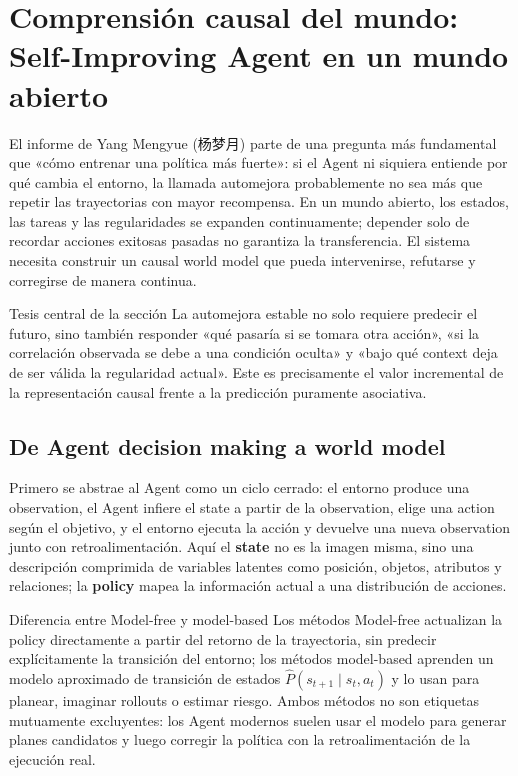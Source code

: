 \section{Comprensión causal del mundo: Self-Improving Agent en un mundo abierto}

El informe de Yang Mengyue (杨梦月) parte de una pregunta más fundamental que «cómo entrenar una política más fuerte»: si el Agent ni siquiera entiende por qué cambia el entorno, la llamada automejora probablemente no sea más que repetir las trayectorias con mayor recompensa. En un mundo abierto, los estados, las tareas y las regularidades se expanden continuamente; depender solo de recordar acciones exitosas pasadas no garantiza la transferencia. El sistema necesita construir un causal world model que pueda intervenirse, refutarse y corregirse de manera continua.

\begin{importantbox}{Tesis central de la sección}
La automejora estable no solo requiere predecir el futuro, sino también responder «qué pasaría si se tomara otra acción», «si la correlación observada se debe a una condición oculta» y «bajo qué context deja de ser válida la regularidad actual». Este es precisamente el valor incremental de la representación causal frente a la predicción puramente asociativa.
\end{importantbox}

\subsection{De Agent decision making a world model}

Primero se abstrae al Agent como un ciclo cerrado: el entorno produce una observation, el Agent infiere el state a partir de la observation, elige una action según el objetivo, y el entorno ejecuta la acción y devuelve una nueva observation junto con retroalimentación. Aquí el \textbf{state} no es la imagen misma, sino una descripción comprimida de variables latentes como posición, objetos, atributos y relaciones; la \textbf{policy} mapea la información actual a una distribución de acciones.


\begin{knowledgebox}{Diferencia entre Model-free y model-based}
Los métodos Model-free actualizan la policy directamente a partir del retorno de la trayectoria, sin predecir explícitamente la transición del entorno; los métodos model-based aprenden un modelo aproximado de transición de estados $\hat P(s_{t+1}\mid s_t,a_t)$ y lo usan para planear, imaginar rollouts o estimar riesgo. Ambos métodos no son etiquetas mutuamente excluyentes: los Agent modernos suelen usar el modelo para generar planes candidatos y luego corregir la política con la retroalimentación de la ejecución real.
\end{knowledgebox}

